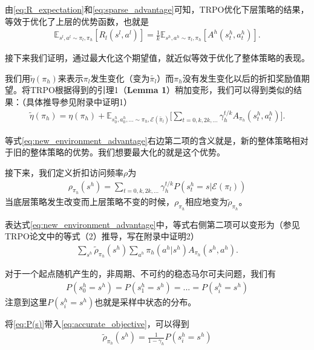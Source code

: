 \documentclass[degree=bachelor, tocarialchapter, pifootnote]{thuthesis}
\begin{document}
由\eqref{eq:R_expectation}和\eqref{eq:sparse_advantage}可知，TRPO优化下层策略的结果，等效于优化了上层的优势函数，也就是
\begin{align}
  \mathbb{E}_{s^l, a^l \sim \pi_l, \pi_h}[R_l(s^l, a^l)] = \frac{1}{k} \mathbb{E}_{s^h, a^h \sim \pi_l, \pi_h}[A^h(s_t^h, a_t^h)].
  \label{eq:R_expectation_is_advantage}
\end{align}

接下来我们证明，通过最大化这个期望值，就近似等效于优化了整体策略的表现。

我们用$\tilde{\eta}(\pi_h)$来表示$\pi_l$发生变化（变为$\tilde{\pi_l}$）而$\pi_h$没有发生变化以后的折扣奖励值期望。将TRPO根据\cite{TRPO_pre}得到的引理1（\textbf{Lemma 1}）稍加变形，我们可以得到类似的结果：（具体推导参见附录中证明1）
\begin{align}
  \tilde{\eta}(\pi_h) = \eta(\pi_h) + \mathbb{E}_{s_0^h, a_0^h, ... \sim \pi_h, \mathcal{E}(\tilde{\pi_l})}\Bigg[\sum_{t=0,k,2k,...} \gamma_h^{t/k} A_{\pi_h}(s_t^h, a_t^h)\Bigg].
  \label{eq:new_environment_advantage}
\end{align}

等式\eqref{eq:new_environment_advantage}右边第二项的含义就是，新的整体策略相对于旧的整体策略的优势。我们想要最大化的就是这个优势。

接下来，我们定义折扣访问频率$\rho$为
\begin{align}
  \rho_{\pi_h}(s^h) = \sum_{t = 0, k, 2k, ...}\gamma_h^{t/k}P(s_t^h = s|\mathcal{E}(\pi_l))
\end{align}
当底层策略发生改变而上层策略不变的时候，$\rho_{\pi_h}$相应地变为$\tilde{\rho}_{\pi_h}$。

表达式\eqref{eq:new_environment_advantage}中，等式右侧第二项可以变形为（参见TRPO论文中的等式（2）推导，写在附录中证明2）
\begin{align}
  \sum_{s^h}\tilde{\rho}_{\pi_h}(s^h)\sum_{a^h}\pi_h(a^h|s^h)A_{\pi_h}(s^h,a^h).
  \label{eq:accurate_objective}
\end{align}

对于一个起点随机产生的，非周期、不可约的稳态马尔可夫问题，我们有
\begin{align}
  P(s_0^h = s^h) = P(s_1^h = s^h) = ... = P(s_i^h = s^h)
  \label{eq:P(s)}
\end{align}
注意到这里$P(s_i^h = s^h)$也就是采样中状态的分布。

将\eqref{eq:P(s)}带入\eqref{eq:accurate_objective}，可以得到
\begin{align}
  \tilde{\rho}_{\pi_h}(s^h) = \frac{1}{1-\gamma_h}P(s_i^h = s^h)
  \label{eq:rho_constant}
\end{align}
\end{document}
